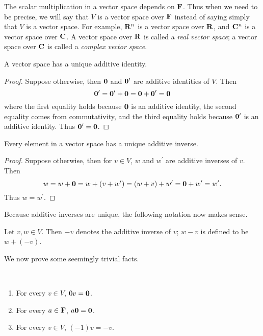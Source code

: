 The scalar multiplication in a vector space depends on $\mathbf F$. Thus when we
need to be precise, we will say that $V$ is a vector space over $\mathbf F$ instead of saying simply that $V$ is a vector space. For example, $\mathbf R^n$ is a vector space over $\mathbf R$, and $\mathbf C^n$ is a vector space over $\mathbf C$. A vector space over $\mathbf R$ is called a \emph{real vector space}; a vector space over $\mathbf C$ is called a \emph{complex vector space}.

\begin{proposition}
A vector space has a unique additive identity.
\end{proposition}

\begin{proof}
Suppose otherwise, then $\vb{0}$ and $\vb{0}^\prime$ are additive identities of $V$. Then
\[\vb{0}^\prime=\vb{0}^\prime+\vb{0}=\vb{0}+\vb{0}^\prime=\vb{0}\]
where the first equality holds because $\vb{0}$ is an additive identity, the second equality comes from commutativity, and the third equality holds because $\vb{0}^\prime$ is an additive identity. Thus $\vb{0}^\prime=\vb{0}$.
\end{proof}

\begin{proposition}
Every element in a vector space has a unique additive inverse.
\end{proposition}

\begin{proof}
Suppose otherwise, then for $v\in V$, $w$ and $w^\prime$ are additive inverses of $v$. Then
\[w=w+\vb{0}=w+(v+w^\prime)=(w+v)+w^\prime=\vb{0}+w^\prime=w^\prime.\]
Thus $w=w^\prime$.
\end{proof}

Because additive inverses are unique, the following notation now makes sense.

\begin{notation}
Let $v,w\in V$. Then $-v$ denotes the additive inverse of $v$; $w-v$ is defined to be $w+(-v)$.
\end{notation}

We now prove some seemingly trivial facts.

\begin{proposition} \
\begin{enumerate}[label=(\roman*)]
\item For every $v\in V$, $0v=\vb{0}$.
\item For every $a\in\mathbf F$, $a\vb{0}=\vb{0}$.
\item For every $v\in V$, $(-1)v=-v$.
\end{enumerate}
\end{proposition}

